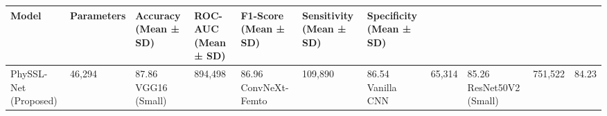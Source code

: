 \begin{tabular}{lllllll}
\toprule
Model & Parameters & Accuracy (Mean ± SD) & ROC-AUC (Mean ± SD) & F1-Score (Mean ± SD) & Sensitivity (Mean ± SD) & Specificity (Mean ± SD) \\
\midrule
PhySSL-Net (Proposed) & 46,294 & 87.86%
VGG16 (Small) & 894,498 & 86.96%
ConvNeXt-Femto & 109,890 & 86.54%
Vanilla CNN & 65,314 & 85.26%
ResNet50V2 (Small) & 751,522 & 84.23%
\bottomrule
\end{tabular}
